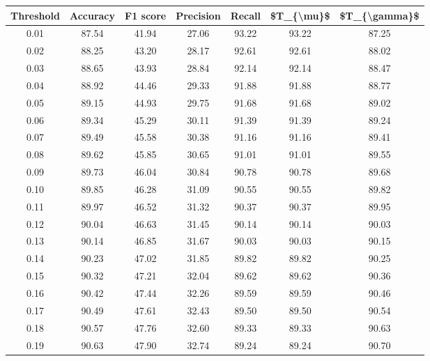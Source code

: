 \begin{tabular}{|c|c|c|c|c|c|c|}
\hline
 Threshold &  Accuracy &  F1 score &  Precision &  Recall &  \$T\_\{\textbackslash mu\}\$ &  \$T\_\{\textbackslash gamma\}\$ \\
\hline
      0.01 &     87.54 &     41.94 &      27.06 &   93.22 &      93.22 &         87.25 \\
      0.02 &     88.25 &     43.20 &      28.17 &   92.61 &      92.61 &         88.02 \\
      0.03 &     88.65 &     43.93 &      28.84 &   92.14 &      92.14 &         88.47 \\
      0.04 &     88.92 &     44.46 &      29.33 &   91.88 &      91.88 &         88.77 \\
      0.05 &     89.15 &     44.93 &      29.75 &   91.68 &      91.68 &         89.02 \\
      0.06 &     89.34 &     45.29 &      30.11 &   91.39 &      91.39 &         89.24 \\
      0.07 &     89.49 &     45.58 &      30.38 &   91.16 &      91.16 &         89.41 \\
      0.08 &     89.62 &     45.85 &      30.65 &   91.01 &      91.01 &         89.55 \\
      0.09 &     89.73 &     46.04 &      30.84 &   90.78 &      90.78 &         89.68 \\
      0.10 &     89.85 &     46.28 &      31.09 &   90.55 &      90.55 &         89.82 \\
      0.11 &     89.97 &     46.52 &      31.32 &   90.37 &      90.37 &         89.95 \\
      0.12 &     90.04 &     46.63 &      31.45 &   90.14 &      90.14 &         90.03 \\
      0.13 &     90.14 &     46.85 &      31.67 &   90.03 &      90.03 &         90.15 \\
      0.14 &     90.23 &     47.02 &      31.85 &   89.82 &      89.82 &         90.25 \\
      0.15 &     90.32 &     47.21 &      32.04 &   89.62 &      89.62 &         90.36 \\
      0.16 &     90.42 &     47.44 &      32.26 &   89.59 &      89.59 &         90.46 \\
      0.17 &     90.49 &     47.61 &      32.43 &   89.50 &      89.50 &         90.54 \\
      0.18 &     90.57 &     47.76 &      32.60 &   89.33 &      89.33 &         90.63 \\
      0.19 &     90.63 &     47.90 &      32.74 &   89.24 &      89.24 &         90.70 \\

\end{tabular}

